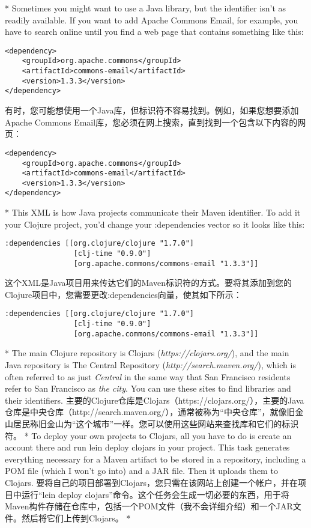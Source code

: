 \begin{paracol}{2}
\switchcolumn[0]*
Sometimes you might want to use a Java library, but the identifier isn't
as readily available. If you want to add Apache Commons Email, for
example, you have to search online until you find a web page that
contains something like this:
\begin{verbatim}
<dependency>
    <groupId>org.apache.commons</groupId>
    <artifactId>commons-email</artifactId>
    <version>1.3.3</version>
</dependency>
\end{verbatim}
\switchcolumn
有时，您可能想使用一个Java库，但标识符不容易找到。例如，如果您想要添加Apache Commons Email库，您必须在网上搜索，直到找到一个包含以下内容的网页：
\begin{verbatim}
<dependency>
    <groupId>org.apache.commons</groupId>
    <artifactId>commons-email</artifactId>
    <version>1.3.3</version>
</dependency>
\end{verbatim}
\switchcolumn[0]*
This XML is how Java projects communicate their Maven identifier. To add
it your Clojure project, you'd change your :dependencies vector so it
looks like this:
\begin{verbatim}
:dependencies [[org.clojure/clojure "1.7.0"]
                [clj-time "0.9.0"]
                [org.apache.commons/commons-email "1.3.3"]]
\end{verbatim}
\switchcolumn
这个XML是Java项目用来传达它们的Maven标识符的方式。要将其添加到您的Clojure项目中，您需要更改:dependencies向量，使其如下所示：
\begin{verbatim}
:dependencies [[org.clojure/clojure "1.7.0"]
                [clj-time "0.9.0"]
                [org.apache.commons/commons-email "1.3.3"]]
\end{verbatim}
\switchcolumn[0]*
The main Clojure repository is Clojars (\emph{https://clojars.org/}),
and the main Java repository is The Central Repository
(\emph{http://search.maven.org/}), which is often referred to as just
\emph{Central} in the same way that San Francisco residents refer to San
Francisco as \emph{the city}. You can use these sites to find libraries
and their identifiers.
\switchcolumn
主要的Clojure仓库是Clojars（https://clojars.org/），主要的Java仓库是中央仓库（http://search.maven.org/），通常被称为“中央仓库”，就像旧金山居民称旧金山为“这个城市”一样。您可以使用这些网站来查找库和它们的标识符。
\switchcolumn[0]*
To deploy your own projects to Clojars, all you have to do is create an
account there and run lein deploy clojars in your project. This task
generates everything necessary for a Maven artifact to be stored in a
repository, including a POM file (which I won't go into) and a JAR file.
Then it uploads them to Clojars.
\switchcolumn
要将自己的项目部署到Clojars，您只需在该网站上创建一个帐户，并在项目中运行“lein deploy clojars”命令。这个任务会生成一切必要的东西，用于将Maven构件存储在仓库中，包括一个POM文件（我不会详细介绍）和一个JAR文件。然后将它们上传到Clojars。
\switchcolumn[0]*

\end{paracol}
